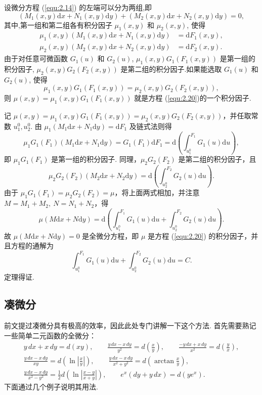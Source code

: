 \begin{thm}
设微分方程 (\ref{equ:2.14}) 的左端可以分为两组,即
\begin{equation}\label{equ:2.20}
    (M_1(x, y)\mathrm{d}x + N_1(x, y)\mathrm{d}y) + (M_2(x, y)\mathrm{d}x + N_2(x, y)\mathrm{d}y) = 0,
\end{equation}
其中,第一组和第二组各有积分因子 \(\mu_1(x, y)\) 和 \(\mu_2(x, y)\), 使得
\begin{align*}
    \mu_1(x, y)(M_1(x, y)\mathrm{d}x + N_1(x, y)\mathrm{d}y) &= \mathrm{d}F_1(x, y), \\
    \mu_2(x, y)(M_2(x, y)\mathrm{d}x + N_2(x, y)\mathrm{d}y) &= \mathrm{d}F_2(x, y).
\end{align*}
由于对任意可微函数 \(G_1(u)\) 和 \(G_2(u)\), \(\mu_1(x, y)G_1(F_1(x, y))\) 是第一组的积分因子, \(\mu_2(x, y)G_2(F_2(x, y))\) 是第二组的积分因子.如果能选取 \(G_1(u)\) 和 \(G_2(u)\), 使得
\[
    \mu_1(x, y)G_1(F_1(x, y)) = \mu_2(x, y)G_2(F_2(x, y)),
\]
则 \(\mu(x, y) = \mu_1(x, y)G_1(F_1(x, y))\) 就是方程 (\ref{equ:2.20})的一个积分因子.
\end{thm}
\begin{pf1}
记 $\mu(x,y)=\mu_1(x,y)G_1(F_1(x,y))=\mu_2(x,y)G_2(F_2(x,y))$，并任取常数
$u_1^0,u_2^0$. 由 $\mu_1(M_1\mathrm{d}x+N_1\mathrm{d}y)=\mathrm{d}F_1$ 及链式法则得
\[
\mu_1G_1(F_1)(M_1\mathrm{d}x+N_1\mathrm{d}y)
=G_1(F_1)\mathrm{d}F_1
=\mathrm{d}\left(\int_{u_1^0}^{F_1}G_1(u)\mathrm{d}u\right),
\]
即 $\mu_1G_1(F_1)$ 是第一组的积分因子. 同理，$\mu_2G_2(F_2)$ 是第二组的积分因子，且
\[
\mu_2G_2(F_2)(M_2\mathrm{d}x+N_2\mathrm{d}y)
=\mathrm{d}\left(\int_{u_2^0}^{F_2}G_2(u)\mathrm{d}u\right).
\]
由于 $\mu_1G_1(F_1)=\mu_2G_2(F_2)=\mu$，将上面两式相加，并注意
$M=M_1+M_2,\ N=N_1+N_2$，得
\[
\mu(M\mathrm{d}x+N\mathrm{d}y)
=\mathrm{d}\left(\int_{u_1^0}^{F_1}G_1(u)\mathrm{d}u+\int_{u_2^0}^{F_2}G_2(u)\mathrm{d}u\right).
\]
故 $\mu(M\mathrm{d}x+N\mathrm{d}y)=0$ 是全微分方程，即 $\mu$ 是方程
(\ref{equ:2.20}) 的积分因子，并且方程的通解为
\[
\int_{u_1^0}^{F_1}G_1(u)\mathrm{d}u+\int_{u_2^0}^{F_2}G_2(u)\mathrm{d}u=C.
\]
定理得证.
\end{pf1}

\subsection{凑微分}
前文提过凑微分具有极高的效率，因此此处专门讲解一下这个方法.
首先需要熟记一些简单二元函数的全微分：
\begin{gather*}
y\,dx+x\,dy = d(xy), \qquad
\frac{y\,dx-x\,dy}{y^2} = d\left(\frac{x}{y}\right), \qquad
\frac{-y\,dx+x\,dy}{x^2} = d\left(\frac{y}{x}\right), \\
\frac{y\,dx-x\,dy}{xy} = d\left(\ln\left|\frac{x}{y}\right|\right), \qquad
\frac{y\,dx-x\,dy}{x^2+y^2} = d\left(\arctan\frac{x}{y}\right), \\
\frac{y\,dx-x\,dy}{x^2-y^2} = \frac{1}{2}d\left(\ln\left|\frac{x-y}{x+y}\right|\right), \qquad
e^x(dy+y\,dx) = d(ye^x).
\end{gather*}
下面通过几个例子说明其用法.

